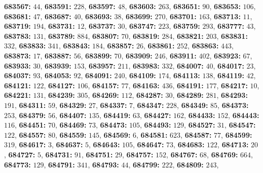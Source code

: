 \textsf{\bfseries 683567:} $44$, \textsf{\bfseries 683591:} $228$, \textsf{\bfseries 683597:} $48$, \textsf{\bfseries 683603:} $263$, \textsf{\bfseries 683651:} $90$, \textsf{\bfseries 683653:} $106$, \textsf{\bfseries 683681:} $47$, \textsf{\bfseries 683687:} $40$, \textsf{\bfseries 683693:} $38$, \textsf{\bfseries 683699:} $270$, \textsf{\bfseries 683701:} $163$, \textsf{\bfseries 683713:} $11$, \textsf{\bfseries 683719:} $194$, \textsf{\bfseries 683731:} $12$, \textsf{\bfseries 683737:} $30$, \textsf{\bfseries 683747:} $223$, \textsf{\bfseries 683759:} $293$, \textsf{\bfseries 683777:} $43$, \textsf{\bfseries 683783:} $131$, \textsf{\bfseries 683789:} $884$, \textsf{\bfseries 683807:} $70$, \textsf{\bfseries 683819:} $284$, \textsf{\bfseries 683821:} $203$, \textsf{\bfseries 683831:} $332$, \textsf{\bfseries 683833:} $341$, \textsf{\bfseries 683843:} $184$, \textsf{\bfseries 683857:} $26$, \textsf{\bfseries 683861:} $252$, \textsf{\bfseries 683863:} $443$, \textsf{\bfseries 683873:} $17$, \textsf{\bfseries 683887:} $56$, \textsf{\bfseries 683899:} $70$, \textsf{\bfseries 683909:} $246$, \textsf{\bfseries 683911:} $402$, \textsf{\bfseries 683923:} $67$, \textsf{\bfseries 683933:} $30$, \textsf{\bfseries 683939:} $153$, \textsf{\bfseries 683957:} $211$, \textsf{\bfseries 683983:} $332$, \textsf{\bfseries 684007:} $40$, \textsf{\bfseries 684017:} $23$, \textsf{\bfseries 684037:} $93$, \textsf{\bfseries 684053:} $92$, \textsf{\bfseries 684091:} $240$, \textsf{\bfseries 684109:} $174$, \textsf{\bfseries 684113:} $138$, \textsf{\bfseries 684119:} $42$, \textsf{\bfseries 684121:} $122$, \textsf{\bfseries 684127:} $106$, \textsf{\bfseries 684157:} $77$, \textsf{\bfseries 684163:} $436$, \textsf{\bfseries 684191:} $177$, \textsf{\bfseries 684217:} $10$, \textsf{\bfseries 684221:} $131$, \textsf{\bfseries 684239:} $305$, \textsf{\bfseries 684269:} $112$, \textsf{\bfseries 684287:} $30$, \textsf{\bfseries 684289:} $281$, \textsf{\bfseries 684293:} $191$, \textsf{\bfseries 684311:} $59$, \textsf{\bfseries 684329:} $27$, \textsf{\bfseries 684337:} $7$, \textsf{\bfseries 684347:} $228$, \textsf{\bfseries 684349:} $85$, \textsf{\bfseries 684373:} $253$, \textsf{\bfseries 684379:} $56$, \textsf{\bfseries 684407:} $135$, \textsf{\bfseries 684419:} $63$, \textsf{\bfseries 684427:} $162$, \textsf{\bfseries 684433:} $152$, \textsf{\bfseries 684443:} $116$, \textsf{\bfseries 684451:} $70$, \textsf{\bfseries 684469:} $73$, \textsf{\bfseries 684473:} $105$, \textsf{\bfseries 684493:} $129$, \textsf{\bfseries 684527:} $31$, \textsf{\bfseries 684547:} $122$, \textsf{\bfseries 684557:} $80$, \textsf{\bfseries 684559:} $145$, \textsf{\bfseries 684569:} $6$, \textsf{\bfseries 684581:} $623$, \textsf{\bfseries 684587:} $77$, \textsf{\bfseries 684599:} $319$, \textsf{\bfseries 684617:} $3$, \textsf{\bfseries 684637:} $5$, \textsf{\bfseries 684643:} $105$, \textsf{\bfseries 684647:} $73$, \textsf{\bfseries 684683:} $122$, \textsf{\bfseries 684713:} $20$, \textsf{\bfseries 684727:} $5$, \textsf{\bfseries 684731:} $91$, \textsf{\bfseries 684751:} $29$, \textsf{\bfseries 684757:} $152$, \textsf{\bfseries 684767:} $68$, \textsf{\bfseries 684769:} $664$, \textsf{\bfseries 684773:} $129$, \textsf{\bfseries 684791:} $341$, \textsf{\bfseries 684793:} $44$, \textsf{\bfseries 684799:} $222$, \textsf{\bfseries 684809:} $243$, 
